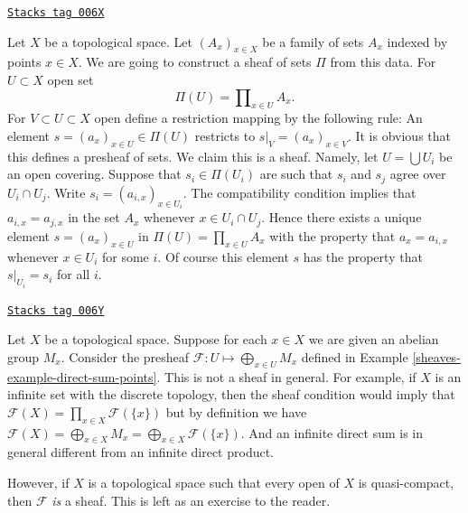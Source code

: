 \begin{example}
\label{sheaves-example-sheaf-product-pointwise}
\href{https://stacks.math.columbia.edu/tag/006X}{\texttt{Stacks tag 006X}}

Let $X$ be a topological space. Let $(A_x)_{x \in X}$ be
a family of sets $A_x$ indexed by points $x \in X$. We are
going to construct a sheaf of sets $\Pi$ from this data.
For $U \subset X$ open set
$$
\Pi(U) = \prod\nolimits_{x \in U} A_x.
$$
For $V \subset U \subset X$ open define
a restriction mapping by the following rule: An element
$s = (a_x)_{x\in U} \in \Pi(U)$ restricts
to $s|_V = (a_x)_{x \in V}$. It is obvious that this
defines a presheaf of sets. We claim this is a sheaf.
Namely, let $U = \bigcup U_i$ be an open covering.
Suppose that $s_i \in \Pi(U_i)$ are
such that $s_i$ and $s_j$ agree over $U_i \cap U_j$. Write
$s_i = (a_{i, x})_{x\in U_i}$. The compatibility condition implies that
$a_{i, x} = a_{j, x}$ in the set $A_x$ whenever $x \in U_i \cap U_j$.
Hence there exists a unique element $s = (a_x)_{x\in U}$
in $\Pi(U) = \prod_{x\in U} A_x$ with the property that
$a_x = a_{i, x}$ whenever $x \in U_i$ for some $i$. Of course this
element $s$ has the property that $s|_{U_i} = s_i$ for all $i$.
\end{example}

\begin{example}
\label{sheaves-example-direct-sum-points-not-sheaf}
\href{https://stacks.math.columbia.edu/tag/006Y}{\texttt{Stacks tag 006Y}}

Let $X$ be a topological space.
Suppose for each $x\in X$ we are given an abelian group $M_x$.
Consider the presheaf $\mathcal{F} : U \mapsto \bigoplus_{x \in U} M_x$
defined in Example \ref{sheaves-example-direct-sum-points}. This
is not a sheaf in general. For example, if $X$ is an infinite set
with the discrete topology, then the sheaf condition
would imply that $\mathcal{F}(X) = \prod_{x\in X} \mathcal{F}(\{x\})$
but by definition we have $\mathcal{F}(X)
= \bigoplus_{x \in X} M_x = \bigoplus_{x \in X} \mathcal{F}(\{x\})$.
And an infinite direct sum is in general different from an infinite
direct product.

\medskip\noindent
However, if $X$ is a topological space such that every open
of $X$ is quasi-compact, then $\mathcal{F}$ {\it is} a sheaf.
This is left as an exercise to the reader.
\end{example}


